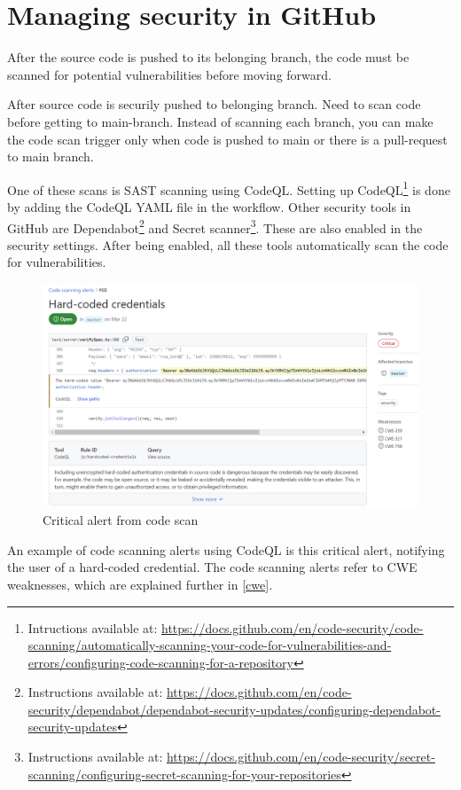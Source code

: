 \section{Managing security in GitHub}
After the source code is pushed to its belonging branch, the code must be scanned for potential vulnerabilities before moving forward.

After source code is securily pushed to belonging branch. Need to scan code before getting to main-branch. Instead of scanning each branch, you can make the code scan trigger only when code is pushed to main or there is a pull-request to main branch.

One of these scans is SAST scanning using CodeQL. Setting up CodeQL\footnote{Intructions available at: \url{https://docs.github.com/en/code-security/code-scanning/automatically-scanning-your-code-for-vulnerabilities-and-errors/configuring-code-scanning-for-a-repository}} is done by adding the CodeQL YAML file in the workflow. Other security tools in GitHub are Dependabot\footnote{Instructions available at: \url{https://docs.github.com/en/code-security/dependabot/dependabot-security-updates/configuring-dependabot-security-updates}} and Secret scanner\footnote{Instructions available at: \url{https://docs.github.com/en/code-security/secret-scanning/configuring-secret-scanning-for-your-repositories}}. These are also enabled in the security settings. After being enabled, all these tools automatically scan the code for vulnerabilities.

\begin{figure}[H]
    \centering
    \includegraphics[width=0.8\columnwidth]{Images/codescan.png}
    \caption{Critical alert from code scan}
    \label{fig: Critical alert from code scan}
\end{figure}

An example of code scanning alerts using CodeQL is this critical alert, notifying the user of a hard-coded credential. The code scanning alerts refer to CWE weaknesses, which are explained further in \ref{cwe}.

